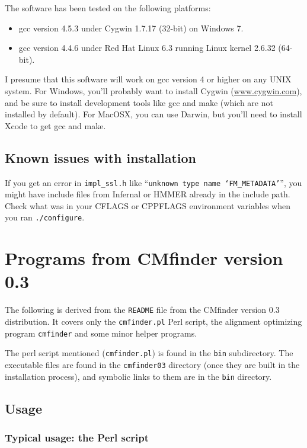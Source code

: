 \documentclass[letterpaper,12pt]{report}
\begin{document}
The software has been tested on the following platforms:
\begin{itemize}
\item gcc version 4.5.3 under Cygwin 1.7.17 (32-bit) on Windows 7.
\item gcc version 4.4.6 under Red Hat Linux 6.3 running Linux kernel 2.6.32 (64-bit).
\end{itemize}

I presume that this software will work on gcc version 4 or higher on any UNIX system.  For Windows, you'll probably want to install Cygwin (\url{www.cygwin.com}), and be sure to install development tools like gcc and make (which are not installed by default).  For MacOSX, you can use Darwin, but you'll need to install Xcode to get gcc and make.

\section{Known issues with installation}

If you get an error in {\tt impl\_ssl.h} like ``{\tt unknown type name `FM\_METADATA'}'', you might have include files from Infernal or HMMER already in the include path.  Check what was in your CFLAGS or CPPFLAGS environment variables when you ran {\tt ./configure}.

\chapter{Programs from CMfinder version 0.3}

The following is derived from the {\tt README} file from the CMfinder version 0.3 distribution.  It covers only the {\tt cmfinder.pl} Perl script, the alignment optimizing program {\tt cmfinder} and some minor helper programs.

The perl script mentioned ({\tt cmfinder.pl}) is found in the {\tt bin} subdirectory.  The executable files are found in the {\tt cmfinder03} directory (once they are built in the installation process), and symbolic links to them are in the {\tt bin} directory.

\section{Usage}

\subsection{Typical usage: the Perl script}
\label{cmfinder.pl}
\end{document}
